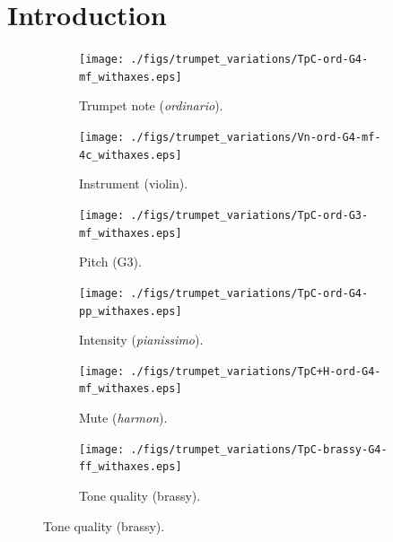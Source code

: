 
\newcommand*{\eg}{e.g.\@\xspace}
\newcommand*{\ie}{i.e.\@\xspace}
\newcommand*{\resp}{resp.\@\xspace}
\newcommand*{\vs}{vs.\@\xspace}

\newcommand{\vl}[1]{\textcolor{orange}{Vincent: #1}}
\newcommand{\ja}[1]{\textcolor{magenta}{Joakim: #1}}
\renewcommand{\ml}[1]{\textcolor{blue}{Mathieu: #1}}


\section{Introduction}

\begin{figure}
        \begin{subfigure}{0.25\textwidth}
                \centering
                \texttt{[image: ./figs/trumpet\_variations/TpC-ord-G4-mf\_withaxes.eps]}
                \caption{Trumpet note (\emph{ordinario}).}
                \label{fig:TpC-ord-G4-mf_withaxes}
        \end{subfigure}%
        \begin{subfigure}{0.25\textwidth}
                \centering
                \texttt{[image: ./figs/trumpet\_variations/Vn-ord-G4-mf-4c\_withaxes.eps]}
                \caption{Instrument (violin).}
                \label{fig:Vn-ord-G4-mf-4c_withaxes}
        \end{subfigure}

        \begin{subfigure}{0.25\textwidth}
                \centering
                \texttt{[image: ./figs/trumpet\_variations/TpC-ord-G3-mf\_withaxes.eps]}
                \caption{Pitch (G3).}
                \label{fig:TpC-ord-G3-mf_withaxes}
        \end{subfigure}%
        \begin{subfigure}{0.25\textwidth}
                \centering
                \texttt{[image: ./figs/trumpet\_variations/TpC-ord-G4-pp\_withaxes.eps]}
                \caption{Intensity (\emph{pianissimo}).}
                \label{fig:TpC-ord-G4-pp_withaxes}
        \end{subfigure}

        \begin{subfigure}{0.25\textwidth}
                \centering
                \texttt{[image: ./figs/trumpet\_variations/TpC+H-ord-G4-mf\_withaxes.eps]}
                \caption{Mute (\emph{harmon}).}
                \label{fig:TpC+H-ord-G4-mf_withaxes}
        \end{subfigure}%
        \begin{subfigure}{0.25\textwidth}
                \centering
                \texttt{[image: ./figs/trumpet\_variations/TpC-brassy-G4-ff\_withaxes.eps]}
                \caption{Tone quality (brassy).}
                \label{fig:TpC-brassy-G4-mf_withaxes}
        \end{subfigure}%


\end{figure}
